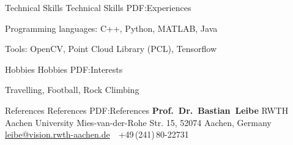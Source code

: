 \documentclass[letterpaper,MMMyyyy,nonstopmode]{simpleresumecv}
\begin{document}
\begin{Body}

\Section
{Technical Skills}
{Technical Skills}
{PDF:Experiences}

\BulletItem Programming languages:
C++,
Python,
MATLAB,
Java

\BulletItem Tools:
OpenCV,
Point Cloud Library (PCL),
Tensorflow

\Section
{Hobbies}
{Hobbies}
{PDF:Interests}

\Entry
Travelling,
Football,
Rock Climbing

\Section
{References}
{References}
{PDF:References}
\BulletItem
\textbf{Prof.~Dr.~Bastian~Leibe}
\newline
RWTH Aachen University
\newline
Mies-van-der-Rohe Str. 15, 52074 Aachen, Germany
\newline
\href{mailto:leibe@vision.rwth-aachen.de}
{leibe@vision.rwth-aachen.de}
\,\SubBulletSymbol\,
+49\,(241)\,80-22731
\end{Body}
%
\end{document}
